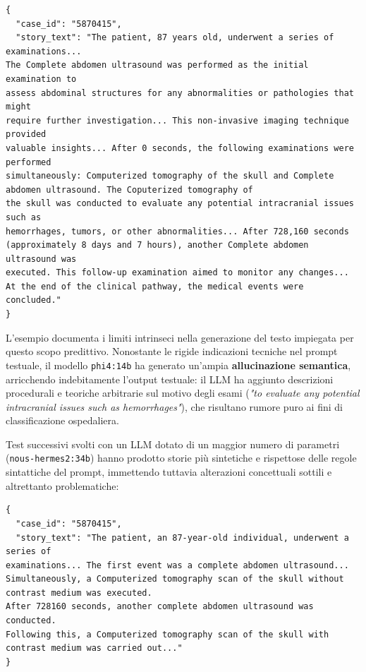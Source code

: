 \begin{verbatim}
{
  "case_id": "5870415",
  "story_text": "The patient, 87 years old, underwent a series of examinations...
The Complete abdomen ultrasound was performed as the initial examination to 
assess abdominal structures for any abnormalities or pathologies that might 
require further investigation... This non-invasive imaging technique provided 
valuable insights... After 0 seconds, the following examinations were performed 
simultaneously: Computerized tomography of the skull and Complete abdomen ultrasound. The Coputerized tomography of 
the skull was conducted to evaluate any potential intracranial issues such as 
hemorrhages, tumors, or other abnormalities... After 728,160 seconds 
(approximately 8 days and 7 hours), another Complete abdomen ultrasound was 
executed. This follow-up examination aimed to monitor any changes...
At the end of the clinical pathway, the medical events were concluded."
}
\end{verbatim}

L'esempio documenta i limiti intrinseci nella generazione del testo impiegata per questo scopo predittivo. Nonostante le rigide indicazioni tecniche nel prompt testuale, il modello \texttt{phi4:14b} ha generato un'ampia \textbf{allucinazione semantica}, arricchendo indebitamente l'output testuale: il LLM ha aggiunto descrizioni procedurali e teoriche arbitrarie sul motivo degli esami (\textit{"to evaluate any potential intracranial issues such as hemorrhages"}), che risultano rumore puro ai fini di classificazione ospedaliera.

Test successivi svolti con un LLM dotato di un maggior numero di parametri (\texttt{nous-hermes2:34b}) hanno prodotto storie più sintetiche e rispettose delle regole sintattiche del prompt, immettendo tuttavia alterazioni concettuali sottili e altrettanto problematiche:

\begin{verbatim}
{
  "case_id": "5870415",
  "story_text": "The patient, an 87-year-old individual, underwent a series of 
examinations... The first event was a complete abdomen ultrasound... 
Simultaneously, a Computerized tomography scan of the skull without contrast medium was executed. 
After 728160 seconds, another complete abdomen ultrasound was conducted. 
Following this, a Computerized tomography scan of the skull with contrast medium was carried out..."
}
\end{verbatim}


